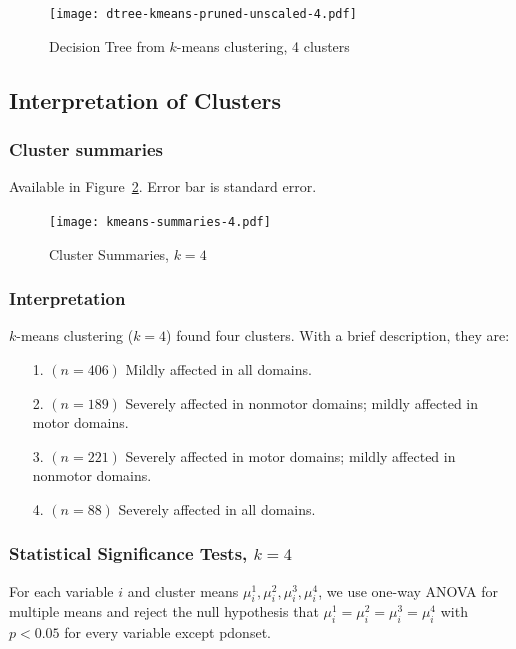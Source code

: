\documentclass[10pt]{article}
\begin{document}
\begin{multicols}{2}
\begin{figure}[H]
  \centering
  \texttt{[image: dtree-kmeans-pruned-unscaled-4.pdf]}
  \caption{Decision Tree from $k$-means clustering, 4 clusters}
  \label{fig:kmeans-dtree-4}
\end{figure}

\subsection{Interpretation of Clusters}

\subsubsection{Cluster summaries}

Available in Figure~\ref{fig:kmeans-summaries-4}. Error bar is standard error.

\begin{figure}[t]
  \centering
  \texttt{[image: kmeans-summaries-4.pdf]}
  \caption{Cluster Summaries, $k = 4$}
  \label{fig:kmeans-summaries-4}
\end{figure}

\subsubsection{Interpretation}
$k$-means clustering ($k = 4$) found four clusters. With a brief description,
they are:

\begin{itemize}
  \item[1.] $(n = 406)$ Mildly affected in all domains.
  \item[2.] $(n = 189)$ Severely affected in nonmotor domains; mildly
    affected in motor domains.
  \item[3.] $(n = 221)$ Severely affected in motor domains; mildly
    affected in nonmotor domains.
  \item[4.] $(n = 88)$ Severely affected in all domains.
\end{itemize}

\subsubsection{Statistical Significance Tests, $k = 4$}
For each variable $i$ and cluster means $\mu_i^1, \mu_i^2, \mu_i^3, \mu_i^4$,
we use one-way ANOVA for multiple means and reject the null hypothesis that
$\mu_i^1 = \mu_i^2 = \mu_i^3 = \mu_i^4$ with $p < 0.05$ for every variable
except pdonset.


\end{multicols}
\end{document}
